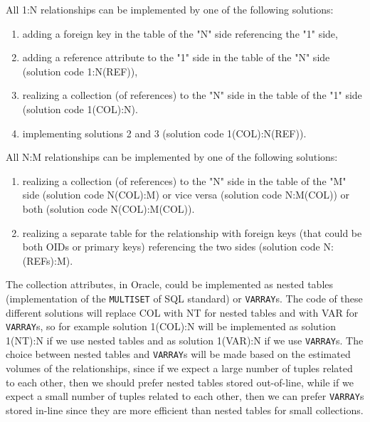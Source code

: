 All 1:N relationships can be implemented by one of the following solutions:
\begin{enumerate}
    \item adding a foreign key in the table of the "N" side referencing the "1" side,
    \item adding a reference attribute to the "1" side in the table of the "N" side (solution code 1:N(REF)),
    \item realizing a collection (of references) to the "N" side in the table of the "1" side (solution code 1(COL):N).
    \item implementing solutions 2 and 3 (solution code 1(COL):N(REF)). 
\end{enumerate}
All N:M relationships can be implemented by one of the following solutions:
\begin{enumerate}
    \item realizing a collection (of references) to the "N" side in the table of the "M" side (solution code N(COL):M) or vice versa (solution code N:M(COL)) or both (solution code N(COL):M(COL)).
    \item realizing a separate table for the relationship with foreign keys (that could be both OIDs or primary keys) referencing the two sides (solution code N:(REFs):M).
\end{enumerate}%
%
The collection attributes, in Oracle, could be implemented as nested tables (implementation of the \texttt{MULTISET} of SQL standard) or \texttt{VARRAY}s. The code of these different solutions will replace COL with NT for nested tables and with VAR for \texttt{VARRAY}s, so for example solution 1(COL):N will be implemented as solution 1(NT):N if we use nested tables and as solution 1(VAR):N if we use \texttt{VARRAY}s. The choice between nested tables and \texttt{VARRAY}s will be made based on the estimated volumes of the relationships, since if we expect a large number of tuples related to each other, then we should prefer nested tables stored out-of-line, while if we expect a small number of tuples related to each other, then we can prefer \texttt{VARRAY}s stored in-line since they are more efficient than nested tables for small collections. 

